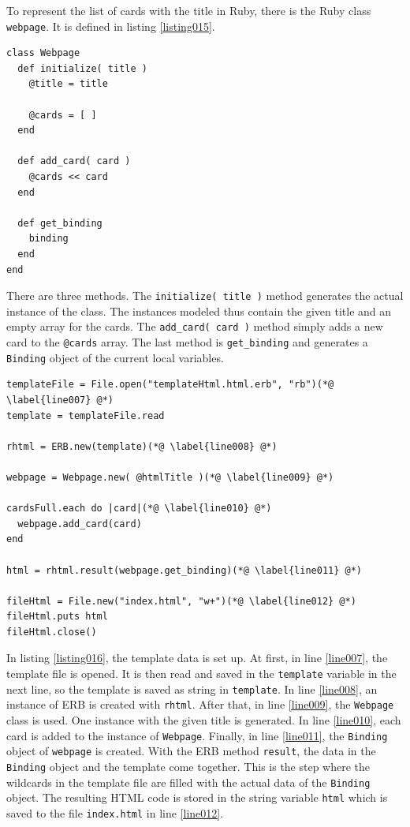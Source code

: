 To represent the list of cards with the title in Ruby, there is the Ruby class \texttt{webpage}. It is defined in listing \ref{listing015}.

\begin{lstlisting}[aboveskip=1\baselineskip, caption=Generating HTML without a templating engine., label=listing015]
class Webpage
  def initialize( title )
    @title = title

    @cards = [ ]
  end

  def add_card( card )
    @cards << card
  end

  def get_binding
    binding
  end
end
\end{lstlisting}

There are three methods. The \lstinline{initialize( title )} method generates the actual instance of the class. The instances modeled thus contain the given title and an empty array for the cards. The \lstinline{add_card( card )} method simply adds a new card to the \lstinline{@cards} array. The last method is \lstinline{get_binding} and generates a \lstinline{Binding} object of the current local variables.

\begin{lstlisting}[aboveskip=1\baselineskip, caption=Generating HTML with ERB., label=listing016]
templateFile = File.open("templateHtml.html.erb", "rb")(*@ \label{line007} @*)
template = templateFile.read

rhtml = ERB.new(template)(*@ \label{line008} @*)

webpage = Webpage.new( @htmlTitle )(*@ \label{line009} @*)

cardsFull.each do |card|(*@ \label{line010} @*)
  webpage.add_card(card)
end

html = rhtml.result(webpage.get_binding)(*@ \label{line011} @*)

fileHtml = File.new("index.html", "w+")(*@ \label{line012} @*)
fileHtml.puts html
fileHtml.close()
\end{lstlisting}

In listing \ref{listing016}, the template data is set up. At first, in line \ref{line007}, the template file is opened. It is then read and saved in the \lstinline{template} variable in the next line, so the template is saved as string in \lstinline{template}. In line \ref{line008}, an instance of ERB is created with \lstinline{rhtml}. After that, in line \ref{line009}, the \lstinline{Webpage} class is used. One instance with the given title is generated. In line \ref{line010}, each card is added to the instance of \lstinline{Webpage}. Finally, in line \ref{line011}, the \lstinline{Binding} object of \lstinline{webpage} is created. With the ERB method \lstinline{result}, the data in the \lstinline{Binding} object and the template come together. This is the step where the wildcards in the template file are filled with the actual data of the \lstinline{Binding} object. The resulting HTML code is stored in the string variable \lstinline{html} which is saved to the file \texttt{index.html} in line \ref{line012}. 

